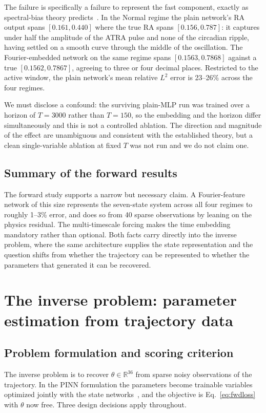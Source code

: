 \documentclass[11pt]{article}
\begin{document}
The failure is specifically a failure to represent the fast component, exactly
as spectral-bias theory predicts~\citep{rahaman2019spectral,wang2022ntk}. In the
Normal regime the plain network's RA output spans $[0.161, 0.440]$ where the
true RA spans $[0.156, 0.787]$: it captures under half the amplitude of the
ATRA pulse and none of the circadian ripple, having settled on a smooth curve
through the middle of the oscillation. The Fourier-embedded network on the same
regime spans $[0.1563, 0.7868]$ against a true $[0.1562, 0.7867]$, agreeing to
three or four decimal places. Restricted to the active window, the plain
network's mean relative $L^2$ error is 23--26\% across the four regimes.

We must disclose a confound: the surviving plain-MLP run was trained over a
horizon of $T = 3000$ rather than $T = 150$, so the embedding and the horizon
differ simultaneously and this is not a controlled ablation. The direction and
magnitude of the effect are unambiguous and consistent with the established
theory, but a clean single-variable ablation at fixed $T$ was not run and we do
not claim one.

\subsection{Summary of the forward results}

The forward study supports a narrow but necessary claim. A Fourier-feature
network of this size represents the seven-state system across all four regimes
to roughly 1--3\% error, and does so from 40 sparse observations by leaning on
the physics residual. The multi-timescale forcing makes the time embedding
mandatory rather than optional. Both facts carry directly into the inverse
problem, where the same architecture supplies the state representation and the
question shifts from whether the trajectory can be represented to whether the
parameters that generated it can be recovered.
\section{The inverse problem: parameter estimation from trajectory data}
\label{sec:inverse}

\subsection{Problem formulation and scoring criterion}

The inverse problem is to recover $\theta \in \mathbb{R}^{36}$ from sparse noisy
observations of the trajectory. In the PINN formulation the parameters become
trainable variables optimized jointly with the state
networks~\citep{raissi2019pinn}, and the objective is Eq.~\eqref{eq:fwdloss}
with $\theta$ now free. Three design decisions apply throughout.
\end{document}
